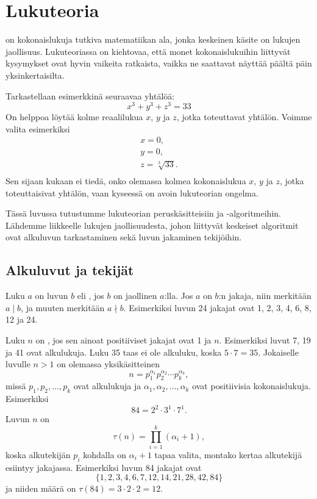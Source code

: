 \chapter{Lukuteoria}


 on kokonaislukuja tutkiva
matematiikan ala, jonka keskeinen
käsite on lukujen jaollisuus.
Lukuteoriassa on kiehtovaa, että monet kokonaislukuihin
liittyvät kysymykset ovat hyvin vaikeita ratkaista,
vaikka ne saattavat näyttää päältä päin yksinkertaisilta.

Tarkastellaan esimerkkinä seuraavaa yhtälöä:
\[x^3 + y^3 + z^3 = 33\]
On helppoa löytää kolme reaalilukua $x$, $y$ ja $z$,
jotka toteuttavat yhtälön. Voimme valita
esimerkiksi
\[
\begin{array}{lcl}
x = 0, \\
y = 0, \\
z = \sqrt[3]{33}.\\
\end{array}
\]
Sen sijaan kukaan ei tiedä, onko olemassa
kolmea kokonaislukua $x$, $y$ ja $z$,
jotka toteuttaisivat yhtälön, vaan kyseessä
on avoin lukuteorian ongelma.

Tässä luvussa tutustumme lukuteorian peruskäsitteisiin ja
-algoritmeihin.
Lähdemme liikkeelle lukujen jaollisuudesta,
johon liittyvät keskeiset algoritmit ovat
alkuluvun tarkastaminen sekä luvun jakaminen tekijöihin.

\section{Alkuluvut ja tekijät}


Luku $a$ on luvun $b$  eli ,
jos $b$ on jaollinen $a$:lla.
Jos $a$ on $b$:n jakaja,
niin merkitään $a \mid b$,
ja muuten merkitään $a \nmid b$.
Esimerkiksi luvun 24 jakajat ovat 1, 2, 3, 4, 6, 8, 12 ja 24.


Luku $n$ on , jos sen ainoat 
positiiviset jakajat ovat 1 ja $n$.
Esimerkiksi luvut 7, 19 ja 41 ovat alkulukuja.
Luku 35 taas ei ole alkuluku, koska $5 \cdot 7 = 35$.
Jokaiselle luvulle $n>1$ on olemassa yksikäsitteinen
\[ n = p_1^{\alpha_1} p_2^{\alpha_2} \cdots p_k^{\alpha_k},\]
missä $p_1,p_2,\ldots,p_k$ ovat alkulukuja
ja $\alpha_1,\alpha_2,\ldots,\alpha_k$ ovat positiivisia
kokonaislukuja. Esimerkiksi
\[84 = 2^2 \cdot 3^1 \cdot 7^1.\]
Luvun $n$  on
\[\tau(n)=\prod_{i=1}^k (\alpha_i+1),\]
koska alkutekijän $p_i$ kohdalla on $\alpha_i+1$
tapaa valita, montako kertaa alkutekijä
esiintyy jakajassa.
Esimerkiksi luvun 84 jakajat ovat
\[\{1,2,3,4,6,7,12,14,21,28,42,84\}\]
ja niiden määrä on $\tau(84)=3 \cdot 2 \cdot 2 = 12$.

